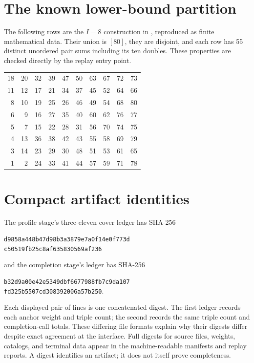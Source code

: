 \documentclass[11pt]{article}
\begin{document}
\section{The known lower-bound partition}\label{app:80}
The following rows are the $I=8$ construction in
\cite[Table I]{XFL}, reproduced as finite mathematical data. Their union
is $[80]$, they are disjoint, and each row has 55 distinct unordered
pair sums including its ten doubles. These properties are checked
directly by the replay entry point.
\begin{center}\small
\begin{tabular}{rrrrrrrrrr}
18&20&32&39&47&50&63&67&72&73\\
11&12&17&21&34&37&45&52&64&66\\
8&10&19&25&26&46&49&54&68&80\\
6&9&16&27&35&40&60&62&76&77\\
5&7&15&22&28&31&56&70&74&75\\
4&13&36&38&42&43&55&58&69&79\\
3&14&23&29&30&48&51&53&61&65\\
1&2&24&33&41&44&57&59&71&78
\end{tabular}
\end{center}

\section{Compact artifact identities}
The profile stage's three-eleven cover ledger has SHA-256
\begin{center}\small\texttt{d9858a448b47d98b3a3879e7a0f14e0f773d}\\
\texttt{c50519fb25c8af635830569af236}\end{center}
and the completion stage's ledger has SHA-256
\begin{center}\small\texttt{b32d9a00e42e5349dbf6677988fb7c9da107}\\
\texttt{fd325b5507cd308392006a57b250}.\end{center}
Each displayed pair of lines is one concatenated digest. The first
ledger records each anchor weight and triple count; the second records
the same triple count and completion-call totals. These differing file
formats explain why their digests differ despite exact agreement at
the interface. Full digests for source files, weights, catalogs, and
terminal data appear in the machine-readable manifests and replay
reports. A digest identifies an artifact; it does not itself prove
completeness.

\begingroup
\raggedright


\endgroup
\end{document}
